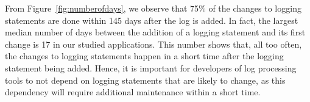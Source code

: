From Figure~\ref{fig:numberofdays}, we observe that 75\% of the changes to logging statements are done within 145 days after the log is added. In fact, the largest median number of days between the addition of a logging statement and its first change is 17 in our studied applications. This number shows that, all too often, the changes to logging statements happen in a short time after the logging statement being added. Hence, it is important for developers of log processing tools to not depend on logging statements that are likely to change, as this dependency will require additional maintenance within a short time.












